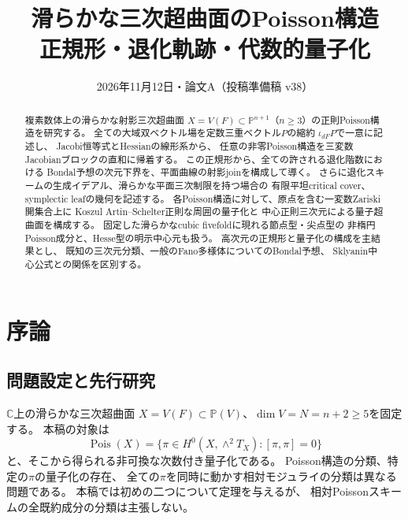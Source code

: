 
\title{滑らかな三次超曲面のPoisson構造\\
\large 正規形・退化軌跡・代数的量子化}
\author{}
\date{2026年11月12日・論文A（投稿準備稿 v38）}

\maketitle
\begin{abstract}
複素数体上の滑らかな射影三次超曲面
$X=V(F)\subset\mathbb P^{n+1}$（$n\geq3$）の正則Poisson構造を研究する。
全ての大域双ベクトル場を定数三重ベクトル$P$の縮約
$\iota_{dF}P$で一意に記述し、
Jacobi恒等式とHessianの線形系から、
任意の非零Poisson構造を三変数Jacobianブロックの直和に帰着する。
この正規形から、全ての許される退化階数における
Bondal予想の次元下界を、平面曲線の射影joinを構成して導く。
さらに退化スキームの生成イデアル、滑らかな平面三次制限を持つ場合の
有限平坦critical cover、symplectic leafの幾何を記述する。
各Poisson構造に対して、原点を含む一変数Zariski開集合上に
Koszul Artin--Schelter正則な周囲の量子化と
中心正則三次元による量子超曲面を構成する。
固定した滑らかなcubic fivefoldに現れる節点型・尖点型の
非楕円Poisson成分と、Hesse型の明示中心元も扱う。
高次元の正規形と量子化の構成を主結果とし、
既知の三次元分類、一般のFano多様体についてのBondal予想、
Sklyanin中心公式との関係を区別する。
\end{abstract}
\tableofcontents

\section{序論}\label{sec:paperA-introduction}

\subsection*{問題設定と先行研究}
$\mathbb C$上の滑らかな三次超曲面
$X=V(F)\subset\mathbb P(V)$、$\dim V=N=n+2\geq5$を固定する。
本稿の対象は
\[
 \operatorname{Pois}(X)=
 \{\pi\in H^0(X,\wedge^2T_X):[\pi,\pi]=0\}
\]
と、そこから得られる非可換な次数付き量子化である。
Poisson構造の分類、特定の$\pi$の量子化の存在、
全ての$\pi$を同時に動かす相対モジュライの分類は異なる問題である。
本稿では初めの二つについて定理を与えるが、
相対Poissonスキームの全既約成分の分類は主張しない。

